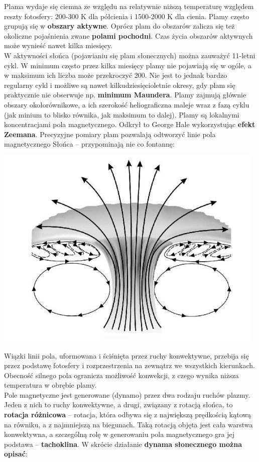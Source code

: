 \documentclass[../index.tex]{subfiles}
\begin{document}
        Plama wydaje się ciemna ze względu na relatywnie niższą temperaturę względem reszty fotosfery: 200-300 K dla półcienia i 1500-2000 K dla cienia. Plamy często grupują się w \textbf{obszary aktywne}. Oprócz plam do obszarów zalicza się też okoliczne pojaśnienia zwane \textbf{polami pochodni}. Czas życia obszarów aktywnych może wynieść nawet kilka miesięcy.\\
        W aktywności słońca (pojawianiu się plam słonecznych) można zauważyć 11-letni cykl. W minimum często przez kilka miesięcy plamy nie pojawiają się w ogóle, a w maksimum ich liczba może przekroczyć 200. Nie jest to jednak bardzo regularny cykl i możliwe są nawet kilkudziesięcioletnie okresy, gdy plam się praktycznie nie obserwuje np. \textbf{minimum Maundera}. Plamy zajmują głównie obszary okołorównikowe, a ich szerokość heliograficzna maleje wraz z fazą cyklu (jak minium to blisko równika, jak maksimum to dalej). Plamy są lokalnymi koncentracjami pola magnetycznego. Odkrył to George Hale wykorzystując \textbf{efekt Zeemana}. Precyzyjne pomiary plam pozwalają odtworzyć linie pola magnetycznego Słońca – przypominają nie co fontannę: 
        \begin{center}
            \includegraphics[width=13cm]{images/plamaSlonecznaFontanna.png}
        \end{center}
        Wiązki linii pola, uformowana i ściśnięta przez ruchy konwektywne, przebija się przez podstawę fotosfery i rozprzestrzenia na zewnątrz we wszystkich kierunkach. Obecność silnego pola ogranicza możliwość konwekcji, z czego wynika niższa temperatura w obrębie plamy.\\
        Pole magnetyczne jest generowane (dynamo) przez dwa rodzaju ruchów plazmy. Jeden z nich to ruchy konwektywne, a drugi, związany z rotacją słońca, to \textbf{rotacja różnicowa} – rotacja, która odbywa się z największą prędkością kątową na równiku, a z najmniejszą na biegunach. Taką rotacją objęta jest cała warstwa konwektywna, a szczególną rolę w generowaniu pola magnetycznego gra jej podstawa – \textbf{tachoklina}. W skrócie działanie \textbf{dynama słonecznego można opisać}:
\end{document}
